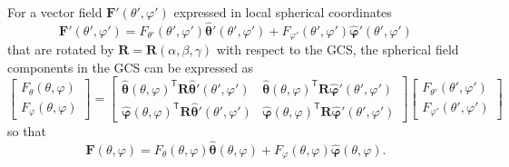 For a vector field $\mathbf{F}'(\theta',\varphi')$ expressed in local spherical coordinates
\begin{equation}
    \mathbf{F}'(\theta',\varphi') = F_{\theta'}(\theta',\varphi')\hat{\boldsymbol{\theta}}'(\theta',\varphi') + F_{\varphi'}(\theta',\varphi')\hat{\boldsymbol{\varphi}}'(\theta',\varphi')
\end{equation}
that are rotated by $\mathbf{R}=\mathbf{R}(\alpha, \beta, \gamma)$ with respect to the \gls{GCS}, the spherical field components in the \gls{GCS} can be expressed as
\begin{equation}
    \label{eq:F_prime_2_F}
    \begin{bmatrix}
        F_\theta(\theta, \varphi) \\
        F_\varphi(\theta, \varphi)
    \end{bmatrix} =
    \begin{bmatrix}
        \hat{\boldsymbol{\theta}}(\theta,\varphi)^\mathsf{T}\mathbf{R}\hat{\boldsymbol{\theta}}'(\theta',\varphi') & \hat{\boldsymbol{\theta}}(\theta,\varphi)^\mathsf{T}\mathbf{R}\hat{\boldsymbol{\varphi}}'(\theta',\varphi') \\
        \hat{\boldsymbol{\varphi}}(\theta,\varphi)^\mathsf{T}\mathbf{R}\hat{\boldsymbol{\theta}}'(\theta',\varphi') & \hat{\boldsymbol{\varphi}}(\theta,\varphi)^\mathsf{T}\mathbf{R}\hat{\boldsymbol{\varphi}}'(\theta',\varphi')
    \end{bmatrix}
    \begin{bmatrix}
        F_{\theta'}(\theta', \varphi') \\
        F_{\varphi'}(\theta', \varphi')
    \end{bmatrix}
\end{equation}
so that
\begin{equation}
    \mathbf{F}(\theta,\varphi) = F_{\theta}(\theta,\varphi)\hat{\boldsymbol{\theta}}(\theta,\varphi) + F_{\varphi}(\theta,\varphi)\hat{\boldsymbol{\varphi}}(\theta,\varphi).
\end{equation}

